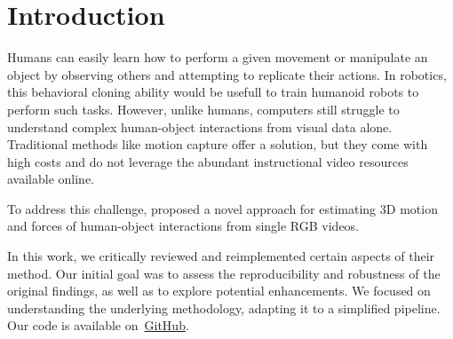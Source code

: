 \section{Introduction}
\label{sec:intro}

Humans can easily learn how to perform a given movement or manipulate an object by observing others and attempting to replicate their actions. 
In robotics, this behavioral cloning ability would be usefull to train humanoid robots to perform such tasks. 
However, unlike humans, computers still struggle to understand complex human-object interactions from visual data alone. 
Traditional methods like motion capture offer a solution, but they come with high costs and do not leverage the abundant instructional video 
resources available online.

To address this challenge, \citet{li2019estimating} proposed a novel approach for estimating 3D motion and forces of human-object interactions 
from single RGB videos. 

In this work, we critically reviewed and reimplemented certain aspects of their method. Our initial goal was to assess 
the reproducibility and robustness of the original findings, as well as to explore potential enhancements. We focused on understanding the 
underlying methodology, adapting it to a simplified pipeline. Our code is available on~\href{https://github.com/balthazarneveu/monocular_pose_and_forces_estimation}{GitHub}.


